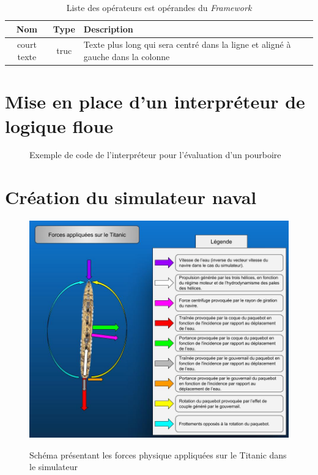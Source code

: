 \documentclass[a4paper,11pt]{article}
\begin{document}
    \begin{table}
        \caption{Liste des opérateurs est opérandes du \textit{Framework}}
        \label{tab:listing}

        \begin{center}
            \begin{tabular}{|c|c|M{4cm}|}
                \hline
                Nom & Type & Description \tabularnewline
                \hline
                court texte & truc & Texte plus long qui sera centré dans la ligne et aligné à gauche dans la colonne  \tabularnewline
                \hline
            \end{tabular}
        \end{center}
    \end{table}
    
    \section{Mise en place d'un interpréteur de logique floue}

    \begin{figure}
        \begin{center}
            \caption{Exemple de code de l’interpréteur pour l’évaluation d'un pourboire}
            
            \label{fig:codeExemple}
        \end{center}
    \end{figure}

    \section{Création du simulateur naval}

    \begin{figure}
        \begin{center}
            \caption{Schéma présentant les forces physique appliquées sur le Titanic dans le simulateur}
            \includegraphics[scale=0.5]{assets/Isaac_vs_Titanic.jpg}
            \label{fig:titanicForces}
        \end{center}
    \end{figure}
\end{document}
